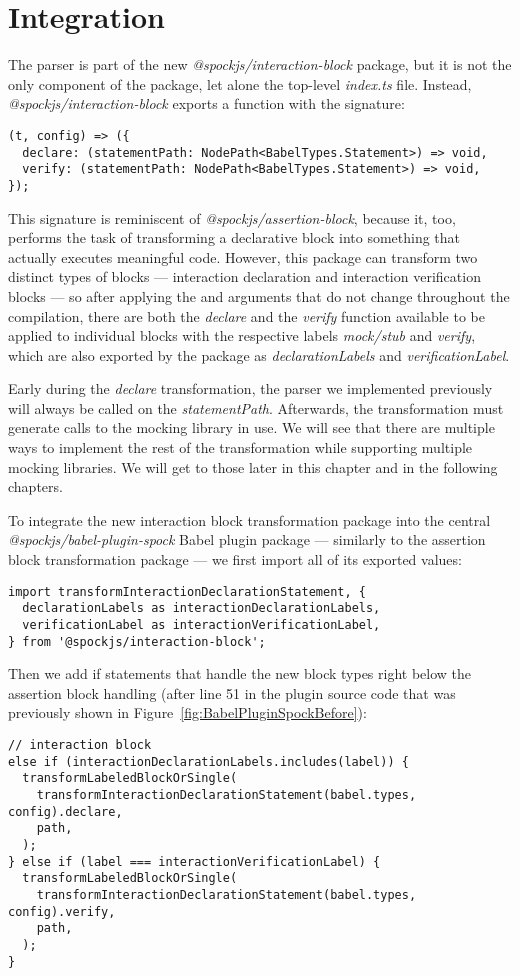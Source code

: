\section{Integration}
The parser is part of the new \textit{@spockjs/interaction-block} package,
but it is not the only component of the package,
let alone the top-level \textit{index.ts} file.
Instead, \textit{@spockjs/interaction-block} exports a function with the signature:
\begin{verbatim}
(t, config) => ({
  declare: (statementPath: NodePath<BabelTypes.Statement>) => void,
  verify: (statementPath: NodePath<BabelTypes.Statement>) => void,
});
\end{verbatim}

This signature is reminiscent of \textit{@spockjs/assertion-block},
because it, too, performs the task of transforming a declarative block into
something that actually executes meaningful code.
However, this package can transform two distinct types of blocks
--- interaction declaration and interaction verification blocks ---
so after applying the  and  arguments
that do not change throughout the compilation,
there are both the \textit{declare} and the \textit{verify} function available
to be applied to individual blocks with the
respective labels \textit{mock/stub} and \textit{verify},
which are also exported by the package as
\textit{declarationLabels} and \textit{verificationLabel}.

Early during the \textit{declare} transformation,
the parser we implemented previously will always be called on the \textit{statementPath}.
Afterwards, the transformation must generate calls to the mocking library in use.
We will see that there are multiple ways to implement the rest of the transformation
while supporting multiple mocking libraries.
We will get to those later in this chapter and in the following chapters.

To integrate the new interaction block transformation package into the
central \textit{@spockjs/babel-plugin-spock} Babel plugin package
--- similarly to the assertion block transformation package ---
we first import all of its exported values:
\begin{verbatim}
import transformInteractionDeclarationStatement, {
  declarationLabels as interactionDeclarationLabels,
  verificationLabel as interactionVerificationLabel,
} from '@spockjs/interaction-block';
\end{verbatim}
Then we add if statements that handle the new block types
right below the assertion block handling
(after line 51 in the plugin source code that was
previously shown in Figure~\ref{fig:BabelPluginSpockBefore}):
\begin{verbatim}
// interaction block
else if (interactionDeclarationLabels.includes(label)) {
  transformLabeledBlockOrSingle(
    transformInteractionDeclarationStatement(babel.types, config).declare,
    path,
  );
} else if (label === interactionVerificationLabel) {
  transformLabeledBlockOrSingle(
    transformInteractionDeclarationStatement(babel.types, config).verify,
    path,
  );
}
\end{verbatim}

